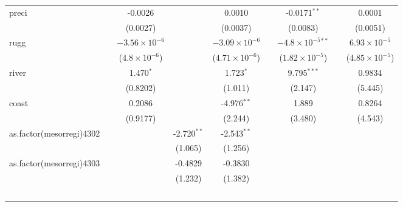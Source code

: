 \documentclass[
  a4paper,
]{article}
\begin{document}
{\begin{tabular}{lcccccccc}
   preci                    &                & -0.0026                &               & 0.0010                  &               & -0.0171$^{**}$               &               & 0.0001\\   
                            &                & (0.0027)               &               & (0.0037)                &               & (0.0083)                     &               & (0.0051)\\   
   rugg                     &                & $-3.56\times 10^{-6}$  &               & $-3.09\times 10^{-6}$   &               & $-4.8\times 10^{-5}$$^{**}$  &               & $6.93\times 10^{-5}$\\    
                            &                & ($4.8\times 10^{-6}$)  &               & ($4.71\times 10^{-6}$)  &               & ($1.82\times 10^{-5}$)       &               & ($4.85\times 10^{-5}$)\\    
   river                    &                & 1.470$^{*}$            &               & 1.723$^{*}$             &               & 9.795$^{***}$                &               & 0.9834\\   
                            &                & (0.8202)               &               & (1.011)                 &               & (2.147)                      &               & (5.445)\\   
   coast                    &                & 0.2086                 &               & -4.976$^{**}$           &               & 1.889                        &               & 0.8264\\   
                            &                & (0.9177)               &               & (2.244)                 &               & (3.480)                      &               & (4.543)\\   
   as.factor(mesorregi)4302 &                &                        & -2.720$^{**}$ & -2.543$^{**}$           &               &                              &               &   \\   
                            &                &                        & (1.065)       & (1.256)                 &               &                              &               &   \\   
   as.factor(mesorregi)4303 &                &                        & -0.4829       & -0.3830                 &               &                              &               &   \\   
                            &                &                        & (1.232)       & (1.382)                 &               &                              &               &   \\   
$$
\end{tabular}}
\end{document}
